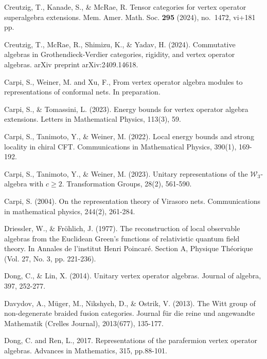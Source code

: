 \documentclass[11pt,b5paper,notitlepage]{article}
\theoremstyle{definition}
\theoremstyle{plain}
\newcommand{\mc}{\mathcal}
\numberwithin{equation}{section}
\begin{document}
\begin{thebibliography}{999999}
Creutzig, T., Kanade, S., \& McRae, R. Tensor categories for vertex operator superalgebra extensions. Mem. Amer. Math. Soc. {\bf 295} (2024), no.~1472, vi+181 pp.


Creutzig, T., McRae, R., Shimizu, K., \& Yadav, H. (2024). Commutative algebras in Grothendieck-Verdier categories, rigidity, and vertex operator algebras. arXiv preprint arXiv:2409.14618.

Carpi, S., Weiner, M. and Xu, F., From vertex operator algebra modules to representations of conformal nets. In preparation.

Carpi, S., \& Tomassini, L. (2023). Energy bounds for vertex operator algebra extensions. Letters in Mathematical Physics, 113(3), 59.

Carpi, S., Tanimoto, Y., \& Weiner, M. (2022). Local energy bounds and strong locality in chiral CFT. Communications in Mathematical Physics, 390(1), 169-192.

Carpi, S., Tanimoto, Y., \& Weiner, M. (2023). Unitary representations of the $\mc W_3$-algebra with $c\geq2$. Transformation Groups, 28(2), 561-590.

Carpi, S. (2004). On the representation theory of Virasoro nets. Communications in mathematical physics, 244(2), 261-284.

Driessler, W., \& Fröhlich, J. (1977). The reconstruction of local observable algebras from the Euclidean Green's functions of relativistic quantum field theory. In Annales de l'institut Henri Poincaré. Section A, Physique Théorique (Vol. 27, No. 3, pp. 221-236).




Dong, C., \& Lin, X. (2014). Unitary vertex operator algebras. Journal of algebra, 397, 252-277.

Davydov, A., M\"uger, M., Nikshych, D., \& Ostrik, V. (2013). The Witt group of non-degenerate braided fusion categories. Journal für die reine und angewandte Mathematik (Crelles Journal), 2013(677), 135-177.


Dong, C. and Ren, L., 2017. Representations of the parafermion vertex operator algebras. Advances in Mathematics, 315, pp.88-101.


\end{thebibliography}
\end{document}
